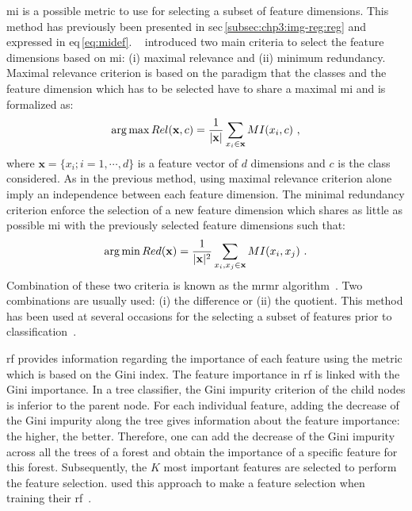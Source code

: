 \Ac{mi} is a possible metric to use for selecting a subset of feature dimensions.
This method has previously been presented in
\acs{sec}\,\ref{subsec:chp3:img-reg:reg} and expressed in
\acs{eq}\,\eqref{eq:midef}.
\citeauthor{Peng2005}~\cite{Peng2005} introduced two main criteria to select
the feature dimensions based on \ac{mi}: (i) maximal relevance and (ii) minimum
redundancy.
Maximal relevance criterion is based on the paradigm that the classes and the
feature dimension which has to be selected have to share a maximal \ac{mi} and
is formalized as:
\begin{equation}
  \operatorname*{arg\,max} Rel(\mathbf{x},c) = \frac{1}{|\mathbf{x}|} \sum_{x_i \in \mathbf{x}} MI(x_i,c)  \ ,
  \label{eq:mRel}
\end{equation}
\noindent where $\mathbf{x} = \{x_i; i=1,\cdots,d\}$ is a feature vector of $d$
dimensions and $c$ is the class considered.
As in the previous method, using maximal relevance criterion alone imply an
independence between each feature dimension.
The minimal redundancy criterion enforce the selection of a new feature
dimension which shares as little as possible \ac{mi} with the previously
selected feature dimensions such that:
\begin{equation}
  \operatorname*{arg\,min} Red(\mathbf{x}) = \frac{1}{|\mathbf{x}|^2} \sum_{x_i,x_j \in \mathbf{x}} MI(x_i,x_j)  \ .
  \label{eq:mRed}
\end{equation}
Combination of these two criteria is known as the \ac{mrmr}
algorithm~\cite{Peng2005}.
Two combinations are usually used: (i) the difference or (ii) the quotient.
This method has been used at several occasions for the selecting a subset of
features prior to
classification~\cite{Niaf2011,Niaf2012,lehaire2014computer,Viswanath2012,khalvati2015automated,chung2015prostate}.

\Ac{rf} provides information regarding the importance of each feature using the
metric which is based on the Gini index.
The feature importance in \ac{rf} is linked with the Gini importance.
In a tree classifier, the Gini impurity criterion of the child nodes is
inferior to the parent node.
For each individual feature, adding the decrease of the Gini impurity along the
tree gives information about the feature importance: the higher, the better.
Therefore, one can add the decrease of the Gini impurity across all the trees
of a forest and obtain the importance of a specific feature for this forest.
Subsequently, the $K$ most important features are selected to perform the
feature selection.
\citeauthor{Lemaitre2016thesis} used this approach to make a feature selection
when training their \ac{rf}~\cite{Lemaitre2016thesis}.


